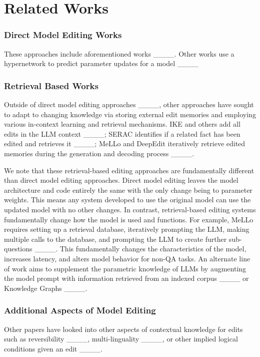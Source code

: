 \section{Related Works}
\subsubsection{Direct Model Editing Works} These approaches include aforementioned works ____. Other works use a hypernetwork to predict parameter updates for a model ____ 

\subsubsection{Retrieval Based Works} Outside of direct model editing approaches ____, other approaches have sought to adapt to changing knowledge via storing external edit memories and employing various in-context learning and retrieval mechanisms. IKE and others add all edits in the LLM context ____; SERAC identifies if a related fact has been edited and retrieves it ____; MeLLo and DeepEdit iteratively retrieve edited memories during the generation and decoding process ____. 
    
We note that these retrieval-based editing approaches are fundamentally different than direct model editing approaches. Direct model editing leaves the model architecture and code entirely the same with the only change being to parameter weights. This means any system developed to use the original model can use the updated model with no other changes. In contrast, retrieval-based editing systems fundamentally change how the model is used and functions. For example, MeLLo requires setting up a retrieval database, iteratively prompting the LLM, making multiple calls to the database, and prompting the LLM to create further sub-questions ____. This fundamentally changes the characteristics of the model, increases latency, and alters model behavior for non-QA tasks. An alternate line of work aims to supplement the parametric knowledge of LLMs by augmenting the model prompt with information retrieved from an indexed corpus ____ or Knowledge Graphs ____. 

\subsubsection{Additional Aspects of Model Editing} Other papers have looked into other aspects of contextual knowledge for edits such as reversibility ____, multi-linguality ____, or other implied logical conditions given an edit ____.